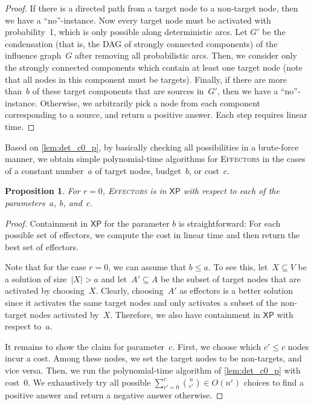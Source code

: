 \documentclass{article}
\newcommand{\xp}{{\mathsf{XP}}}
\newtheorem{proposition}{Proposition}
\newcommand{\probEffectors}{\textsc{Effectors}\xspace}
\begin{document}
\begin{proof}
  If there is a directed path from a target node to a non-target node,
  then we have a ``no''-instance.
  Now every target node must be activated with probability~1,
  which is only possible along deterministic arcs.
  Let $G'$ be the condensation (that is, the DAG of strongly connected
  components) of the influence graph~$G$ after
  removing all probabilistic arcs.
  Then, we consider only the strongly connected components which
  contain at least one target node
  (note that all nodes in this component must be targets).
  Finally, if there are more than~$b$ of these target components that
  are sources in~$G'$, then we have a ``no''-instance.
  Otherwise, we arbitrarily pick a node from each component corresponding to a source,
  and return a positive answer.
  Each step requires linear time. 
\end{proof}

\noindent 
Based on \autoref{lem:det_c0_p},
by basically checking all possibilities in a brute-force manner,
we obtain simple polynomial-time algorithms for
\probEffectors in the cases of a constant number~$a$ of target
nodes, budget~$b$, or cost~$c$.

\begin{proposition}\label{prop:generalZEROrXP}
  For $r = 0$, \probEffectors is in $\xp$ with respect to each of
  the parameters~$a$, $b$, and~$c$.
\end{proposition}

\begin{proof}
  Containment in $\xp$ for the parameter $b$ is straightforward:
  For each possible set of effectors, we compute the cost in linear time and
  then return the best set of effectors.

  Note that for the case $r = 0$, we can assume that $b \leq a$.
  To see this, let~$X\subseteq V$ be a solution of size~$|X|> a$ and let~$A'\subseteq A$ be the subset of target nodes that are activated by choosing~$X$.
  Clearly, choosing~$A'$ as effectors is a better solution since it activates the
  same target nodes and only activates a subset of the non-target nodes activated by~$X$.
  Therefore, we also have containment in $\xp$ with respect to~$a$.

  It remains to show the claim for parameter~$c$.
  First, we choose which $c'\le c$ nodes incur a cost.
  Among these nodes, we set the target nodes to be non-targets, and vice versa.
  Then, we run the polynomial-time algorithm of \autoref{lem:det_c0_p} with cost~0.
  We exhaustively try all possible $\sum_{c'=0}^c\binom{n}{c'} \in O(n ^ c)$ choices to find a
  positive answer and return a negative answer otherwise. 
\end{proof}
\end{document}

